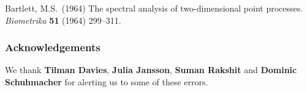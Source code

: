 \documentclass[12pt,a4paper]{article}
\begin{document}
Bartlett, M.S.\ (1964)
The spectral analysis of two-dimensional point processes.
\emph{Biometrika} \textbf{51} (1964) 299--311.

\subsubsection*{Acknowledgements}

We thank \textbf{Tilman Davies}, \textbf{Julia Jansson},
\textbf{Suman Rakshit} and
\textbf{Dominic Schuhmacher} for alerting us to some of these errors.\\
\end{document}
